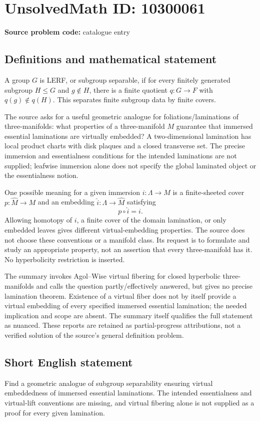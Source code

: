 \documentclass[11pt]{article}
\begin{document}
\section*{UnsolvedMath ID: 10300061}
\textbf{Source problem code:} catalogue entry
\subsection{Definitions and mathematical statement}
A group \(G\) is LERF, or subgroup separable, if for every finitely generated subgroup \(H\le G\) and \(g\notin H\), there is a finite quotient \(q:G\to F\) with \(q(g)\notin q(H)\). This separates finite subgroup data by finite covers.

The source asks for a useful geometric analogue for foliations/laminations of three-manifolds: what properties of a three-manifold \(M\) guarantee that immersed essential laminations are virtually embedded? A two-dimensional lamination has local product charts with disk plaques and a closed transverse set. The precise immersion and essentialness conditions for the intended laminations are not supplied; leafwise immersion alone does not specify the global laminated object or the essentialness notion.

One possible meaning for a given immersion \(i:\Lambda\to M\) is a finite-sheeted cover \(p:\widehat M\to M\) and an embedding \(\widehat i:\Lambda\to\widehat M\) satisfying
\[
 p\circ\widehat i=i.
\]
Allowing homotopy of \(i\), a finite cover of the domain lamination, or only embedded leaves gives different virtual-embedding properties. The source does not choose these conventions or a manifold class. Its request is to formulate and study an appropriate property, not an assertion that every three-manifold has it. No hyperbolicity restriction is inserted.

The summary invokes Agol--Wise virtual fibering for closed hyperbolic three-manifolds and calls the question partly/effectively answered, but gives no precise lamination theorem. Existence of a virtual fiber does not by itself provide a virtual embedding of every specified immersed essential lamination; the needed implication and scope are absent. The summary itself qualifies the full statement as nuanced. These reports are retained as partial-progress attributions, not a verified solution of the source's general definition problem.
\subsection{Short English statement}
Find a geometric analogue of subgroup separability ensuring virtual embeddedness of immersed essential laminations. The intended essentialness and virtual-lift conventions are missing, and virtual fibering alone is not supplied as a proof for every given lamination.
\end{document}
